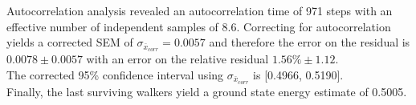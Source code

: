 \documentclass[reqno]{amsart}
\numberwithin{equation}{section}
\numberwithin{figure}{section}
\begin{document}
Autocorrelation analysis revealed an autocorrelation time of 971 steps with an effective number of independent samples of 8.6. Correcting for autocorrelation yields a corrected SEM of $\sigma_{\bar{x}_{corr}} = 0.0057$ and therefore the error on the residual is $0.0078 \pm 0.0057$ with an error on the relative residual $1.56\% \pm 1.12$. \\

The corrected 95\% confidence interval using $\sigma_{\bar{x}_{corr}}$ is [0.4966, 0.5190]. \\

Finally, the last surviving walkers yield a ground state energy estimate of 0.5005. \\

\end{document}
